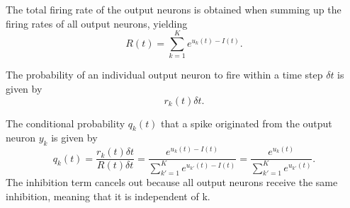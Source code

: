The total firing rate of the output neurons is obtained when summing up the firing rates of all output neurons, yielding 
\begin{equation}
\label{eqn:R}
R(t) = \sum_{k=1}^K e^{u_k(t) - I(t)}.
\end{equation}

The probability of an individual output neuron to fire within a time step $\delta t$ is given by
\begin{equation}
\label{eqn:rkdt}
r_k(t) \delta t.
\end{equation}

The conditional probability $q_k(t)$ that a spike originated from the output neuron $y_k$ is given by
\begin{equation}
\label{eqn:qk}
q_k(t) = \frac{r_k(t) \delta t}{R(t) \delta t} = \frac{e^{u_k(t) - I(t)}}{\sum_{k'=1}^K e^{u_{k'}(t) - I(t)}} = \frac{e^{u_k(t)}}{\sum_{k'=1}^K e^{u_{k'}(t)}}.
\end{equation}
The inhibition term cancels out because all output neurons receive the same inhibition, meaning that it is independent of k.

